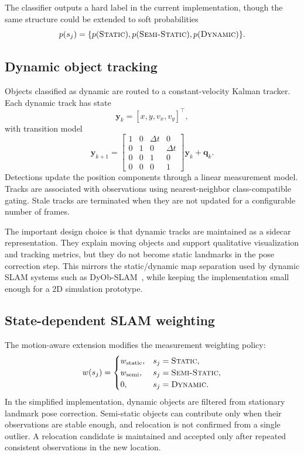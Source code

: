 ﻿\documentclass[11pt]{article}
\newcommand{\Static}{\textsc{Static}}
\newcommand{\SemiStatic}{\textsc{Semi-Static}}
\newcommand{\Dynamic}{\textsc{Dynamic}}
\begin{document}
The classifier outputs a hard label in the current implementation, though the same structure could be extended to soft probabilities
\begin{equation}
    p(s_j) = \{p(\Static), p(\SemiStatic), p(\Dynamic)\}.
\end{equation}

\subsection{Dynamic object tracking}
Objects classified as dynamic are routed to a constant-velocity Kalman tracker. Each dynamic track has state
\begin{equation}
    \mathbf{y}_k = [x, y, v_x, v_y]^\top,
\end{equation}
with transition model
\begin{equation}
    \mathbf{y}_{k+1} =
    \begin{bmatrix}
    1 & 0 & \Delta t & 0 \\
    0 & 1 & 0 & \Delta t \\
    0 & 0 & 1 & 0 \\
    0 & 0 & 0 & 1
    \end{bmatrix}
    \mathbf{y}_k + \mathbf{q}_k.
\end{equation}
Detections update the position components through a linear measurement model. Tracks are associated with observations using nearest-neighbor class-compatible gating. Stale tracks are terminated when they are not updated for a configurable number of frames.

The important design choice is that dynamic tracks are maintained as a sidecar representation. They explain moving objects and support qualitative visualization and tracking metrics, but they do not become static landmarks in the pose correction step. This mirrors the static/dynamic map separation used by dynamic SLAM systems such as DyOb-SLAM~\cite{wadud2022dyobslam}, while keeping the implementation small enough for a 2D simulation prototype.

\subsection{State-dependent SLAM weighting}
The motion-aware extension modifies the measurement weighting policy:
\begin{equation}
    w(s_j) =
    \begin{cases}
    w_{\mathrm{static}}, & s_j = \Static, \\
    w_{\mathrm{semi}}, & s_j = \SemiStatic, \\
    0, & s_j = \Dynamic.
    \end{cases}
\end{equation}
In the simplified implementation, dynamic objects are filtered from stationary landmark pose correction. Semi-static objects can contribute only when their observations are stable enough, and relocation is not confirmed from a single outlier. A relocation candidate is maintained and accepted only after repeated consistent observations in the new location.
\end{document}
